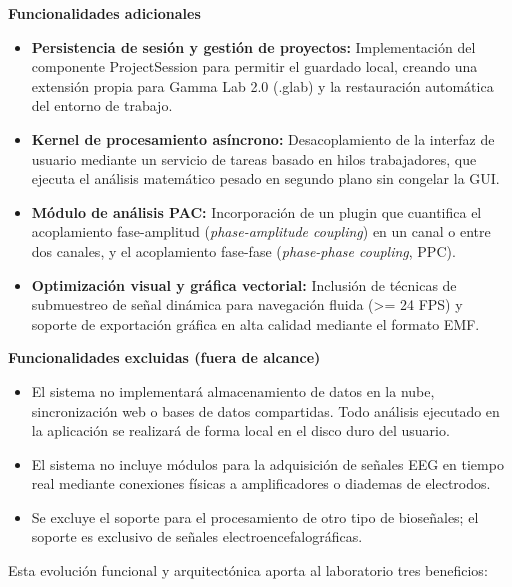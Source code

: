 \documentclass[12pt, letterpaper]{article}
\begin{document}
\textbf{Funcionalidades adicionales}
\begin{itemize}

\item \textbf{Persistencia de sesión y gestión de proyectos:} Implementación del componente ProjectSession para permitir el guardado local, creando una extensión propia para Gamma Lab 2.0 (.glab) y la restauración automática del entorno de trabajo.

\item \textbf{Kernel de procesamiento asíncrono:} Desacoplamiento de la interfaz de usuario mediante un servicio de tareas basado en hilos trabajadores, que ejecuta el análisis matemático pesado en segundo plano sin congelar la GUI.

\item \textbf{Módulo de análisis PAC:} Incorporación de un plugin que cuantifica el acoplamiento fase-amplitud (\textit{phase-amplitude coupling}) en un canal o entre dos canales, y el acoplamiento fase-fase (\textit{phase-phase coupling}, PPC).

\item \textbf{Optimización visual y gráfica vectorial:} Inclusión de técnicas de submuestreo de señal dinámica para navegación fluida (>= 24 FPS) y soporte de exportación gráfica en alta calidad mediante el formato EMF.

\end{itemize}

\textbf{Funcionalidades excluidas (fuera de alcance)}
\begin{itemize}

\item El sistema no implementará almacenamiento de datos en la nube, sincronización web o bases de datos compartidas. Todo análisis ejecutado en la aplicación se realizará de forma local en el disco duro del usuario.

\item El sistema no incluye módulos para la adquisición de señales EEG en tiempo real mediante conexiones físicas a amplificadores o diademas de electrodos.

\item Se excluye el soporte para el procesamiento de otro tipo de bioseñales; el soporte es exclusivo de señales electroencefalográficas.

\end{itemize}

Esta evolución funcional y arquitectónica aporta al laboratorio tres beneficios:
\end{document}
